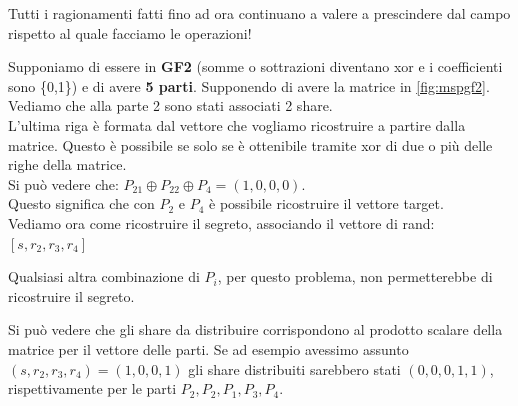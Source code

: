 \begin{remark}
Tutti i ragionamenti fatti fino ad ora continuano a valere a prescindere dal campo rispetto al quale facciamo le operazioni!
\end{remark}
\begin{example}
Supponiamo di essere in \textbf{GF2} (somme o sottrazioni diventano xor e i coefficienti sono \{0,1\}) e di avere \textbf{5 parti}. Supponendo di avere la matrice in \cref{fig:mspgf2}.
Vediamo che alla parte 2 sono stati associati 2 share.\\ 
L'ultima riga è formata dal vettore che vogliamo ricostruire a partire dalla matrice. Questo è possibile se solo se è ottenibile tramite xor di due o più delle righe della matrice.\\
Si può vedere che: $P_{21}\oplus P_{22}\oplus P_4 =(1,0,0,0)$.\\
Questo significa che con $P_2$ e $P_4$ è possibile ricostruire il vettore target.\\
Vediamo ora come ricostruire il segreto, associando il vettore di rand: $[s,r_2,r_3,r_4]$
\begin{remark}
Qualsiasi altra combinazione di $P_i$, per questo problema, non permetterebbe di ricostruire il segreto.
\end{remark}
\begin{remark}
Si può vedere che gli share da distribuire corrispondono al prodotto scalare della matrice per il vettore delle parti. Se ad esempio avessimo assunto $(s,r_2,r_3,r_4)=(1,0,0,1)$ gli share distribuiti sarebbero stati $(0,0,0,1,1)$, rispettivamente per le parti $P_2,P_2,P_1,P_3,P_4$.
\end{remark}
\end{example}
